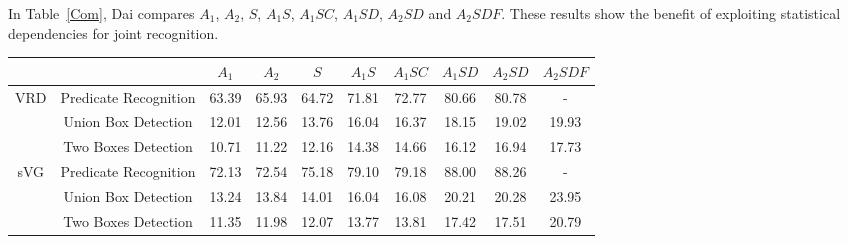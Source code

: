 \documentclass[10pt,twocolumn,letterpaper]{article}
\begin{document}
In Table~\ref{Com}, Dai compares $A_1$, $A_2$, $S$, $A_1S$, $A_1SC$, $A_1SD$, $A_2SD$ and $A_2SDF$. These results show the benefit of exploiting statistical dependencies for joint recognition.

\begin{table*}[tp]
	\caption{Comparison of different variants of the proposed method, using \emph{Recall}@50 as the metric.} \label{Com}
	\begin{tabular}{|c|c|c|c|c|c|c|c|c|c|}
		   \hline
		   &  & $A_1$ & $A_2$ & $S$  & $A_1S$ & $A_1SC$ & $A_1SD$ & $A_2SD$ & $A_2SDF$ \\
		   \hline
		\multirow{3}{*}{VRD}& Predicate Recognition & 63.39 & 65.93 & 64.72  & 71.81 & 72.77 & 80.66 & 80.78 & - \\
		& Union Box Detection & 12.01 & 12.56 & 13.76  & 16.04 & 16.37 & 18.15 & 19.02 & 19.93 \\
		& Two Boxes Detection & 10.71 & 11.22 & 12.16  & 14.38 & 14.66 & 16.12 & 16.94 & 17.73 \\
		\hline\hline
		\multirow{3}{*}{sVG}& Predicate Recognition & 72.13 & 72.54 & 75.18  & 79.10 & 79.18 & 88.00 & 88.26 & - \\
		& Union Box Detection & 13.24 & 13.84 & 14.01  & 16.04 & 16.08 & 20.21 & 20.28 & 23.95 \\
		& Two Boxes Detection & 11.35 & 11.98 & 12.07  & 13.77 & 13.81 & 17.42 & 17.51 & 20.79\\ 
		\hline
	\end{tabular}
\end{table*}

{\small


}
\end{document}

